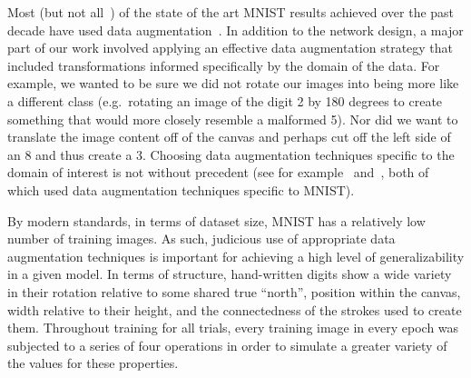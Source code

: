 \documentclass{article}
\begin{document}
Most (but not all~\cite{Hasanpour2016}\cite{Chang2015}) of the state of the art MNIST results achieved over the past decade have used data augmentation~\cite{Sato2015}\cite{Wan2013}\cite{Ciresan2012}.  In addition to the network design, a major part of our work involved applying an effective data augmentation strategy that included transformations informed specifically by the domain of the data.  For example, we wanted to be sure we did not rotate our images into being more like a different class (e.g.\ rotating an image of the digit 2 by 180 degrees to create something that would more closely resemble a malformed 5).  Nor did we want to translate the image content off of the canvas and perhaps cut off the left side of an 8 and thus create a 3.  Choosing data augmentation techniques specific to the domain of interest is not without precedent (see for example~\cite{Ciresan2012} and~\cite{Sabour2017}, both of which used data augmentation techniques specific to MNIST).

By modern standards, in terms of dataset size, MNIST has a relatively low number of training images.  As such, judicious use of appropriate data augmentation techniques is important for achieving a high level of generalizability in a given model.  In terms of structure, hand-written digits show a wide variety in their rotation relative to some shared true ``north'', position within the canvas, width relative to their height, and the connectedness of the strokes used to create them.  Throughout training for all trials, every training image in every epoch was subjected to a series of four operations in order to simulate a greater variety of the values for these properties.
\end{document}
